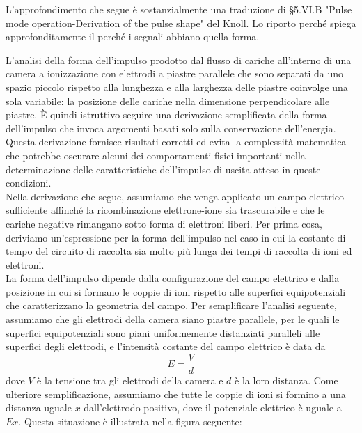 \begin{approfondimento}
   \footnotesize
   L'approfondimento che segue è sostanzialmente una traduzione di \S 5.VI.B "Pulse mode operation-Derivation of the pulse shape" del Knoll. Lo riporto perché spiega approfonditamente il perché i segnali abbiano quella forma.

   \vspace{0.2cm}L'analisi della forma dell'impulso prodotto dal flusso di cariche all'interno di una camera a ionizzazione con elettrodi a piastre parallele che sono separati da uno spazio piccolo rispetto alla lunghezza e alla larghezza delle piastre coinvolge una sola variabile: la posizione delle cariche nella dimensione perpendicolare alle piastre. È quindi istruttivo seguire una derivazione semplificata della forma dell'impulso che invoca argomenti basati solo sulla conservazione dell'energia. Questa derivazione fornisce risultati corretti ed evita la complessità matematica che potrebbe oscurare alcuni dei comportamenti fisici importanti nella determinazione delle caratteristiche dell'impulso di uscita atteso in queste condizioni.\\
   Nella derivazione che segue, assumiamo che venga applicato un campo elettrico sufficiente affinché la ricombinazione elettrone-ione sia trascurabile e che le cariche negative rimangano sotto forma di elettroni liberi. Per prima cosa, deriviamo un'espressione per la forma dell'impulso nel caso in cui la costante di tempo del circuito di raccolta sia molto più lunga dei tempi di raccolta di ioni ed elettroni.\\
   La forma dell'impulso dipende dalla configurazione del campo elettrico e dalla posizione in cui si formano le coppie di ioni rispetto alle superfici equipotenziali che caratterizzano la geometria del campo. Per semplificare l'analisi seguente, assumiamo che gli elettrodi della camera siano piastre parallele, per le quali le superfici equipotenziali sono piani uniformemente distanziati paralleli alle superfici degli elettrodi, e l'intensità costante del campo elettrico è data da
   \begin{equation*}
      E=\frac{V}{d}
   \end{equation*}
   dove $V$ è la tensione tra gli elettrodi della camera e $d$ è la loro distanza. Come ulteriore semplificazione, assumiamo che tutte le coppie di ioni si formino a una distanza uguale $x$ dall'elettrodo positivo, dove il potenziale elettrico è uguale a $Ex$. Questa situazione è illustrata nella figura seguente:
   \begin{figure}[H]

\end{figure}
\end{approfondimento}

